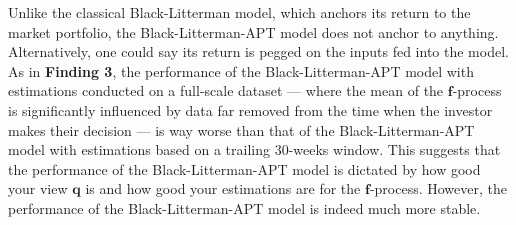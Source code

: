\documentclass[13pt]{article}
\theoremstyle{definition}
\theoremstyle{remark}
\begin{document}
\begin{enumerate}
   Unlike the classical Black-Litterman model, which anchors its return to the market portfolio, the Black-Litterman-APT model does not anchor to anything. Alternatively, one could say its return is pegged on the inputs fed into the model. As in \textbf{Finding 3}, the performance of the Black-Litterman-APT model with estimations conducted on a full-scale dataset — where the mean of the $\bm{f}$-process is significantly influenced by data far removed from the time when the investor makes their decision — is way worse than that of the Black-Litterman-APT model with estimations based on a trailing 30-weeks window. This suggests that the performance of the Black-Litterman-APT model is dictated by how good your view $\bm{q}$ is and how good 
   your estimations are for the $\bm{f}$-process. However, the performance of the Black-Litterman-APT model is indeed much more stable.
\end{enumerate}














\end{document}
